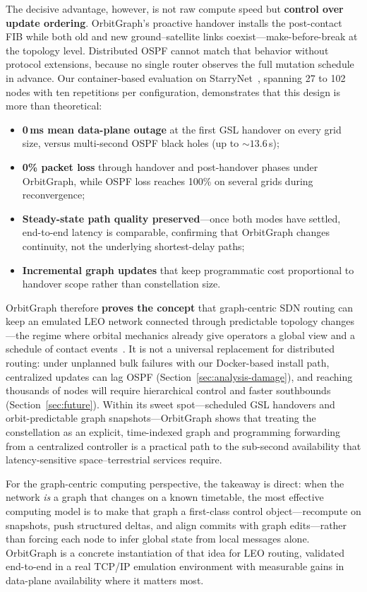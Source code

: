 The decisive advantage, however, is not raw compute speed but \textbf{control
over update ordering}.
OrbitGraph's proactive handover installs the post-contact FIB while both old and
new ground--satellite links coexist---make-before-break at the topology level.
Distributed OSPF cannot match that behavior without protocol extensions,
because no single router observes the full mutation schedule in advance.
Our container-based evaluation on StarryNet~\cite{lai2023starrynet}, spanning
27 to 102 nodes with ten repetitions per configuration, demonstrates that this
design is more than theoretical:
\begin{itemize}
  \item \textbf{0\,ms mean data-plane outage} at the first GSL handover on
        every grid size, versus multi-second OSPF black holes (up to
        ${\sim}13.6$\,s);
  \item \textbf{0\% packet loss} through handover and post-handover phases
        under OrbitGraph, while OSPF loss reaches 100\% on several grids
        during reconvergence;
  \item \textbf{Steady-state path quality preserved}---once both modes have
        settled, end-to-end latency is comparable, confirming that OrbitGraph
        changes continuity, not the underlying shortest-delay paths;
  \item \textbf{Incremental graph updates} that keep programmatic cost
        proportional to handover scope rather than constellation size.
\end{itemize}

OrbitGraph therefore \textbf{proves the concept} that graph-centric SDN routing
can keep an emulated LEO network connected through predictable topology
changes---the regime where orbital mechanics already give operators a global
view and a schedule of contact events~\cite{kassing2020exploring,handley:ground-relays:2019}.
It is not a universal replacement for distributed routing: under unplanned bulk
failures with our Docker-based install path, centralized updates can lag OSPF
(Section~\ref{sec:analysis-damage}), and reaching thousands of nodes will require
hierarchical control and faster southbounds (Section~\ref{sec:future}).
Within its sweet spot---scheduled GSL handovers and orbit-predictable graph
snapshots---OrbitGraph shows that treating the constellation as an explicit,
time-indexed graph and programming forwarding from a centralized controller is
a practical path to the sub-second availability that latency-sensitive
space--terrestrial services require.

For the graph-centric computing perspective, the takeaway is direct: when the
network \emph{is} a graph that changes on a known timetable, the most effective
computing model is to make that graph a first-class control object---recompute
on snapshots, push structured deltas, and align commits with graph edits---rather
than forcing each node to infer global state from local messages alone.
OrbitGraph is a concrete instantiation of that idea for LEO routing, validated
end-to-end in a real TCP/IP emulation environment with measurable gains in
data-plane availability where it matters most.
